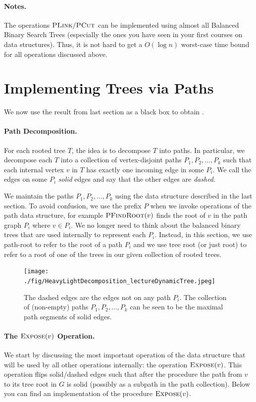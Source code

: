 \paragraph{Notes.} The operations $\textsc{PLink}/ \textsc{PCut}$ can be implemented using almost all Balanced Binary Search Trees (especially the ones you have seen in your first courses on data structures). Thus, it is not hard to get a $O(\log n)$ worst-case time bound for all operations discussed above.

\section{Implementing Trees via Paths}

We now use the result from last section as a black box to obtain .

\paragraph{Path Decomposition.} For each rooted tree $T$, the idea is to decompose $T$ into paths. In particular, we decompose each $T$ into a collection of vertex-disjoint paths $P_1, P_2, \dots, P_k$ such that each internal vertex $v$ in $T$ has exactly one incoming edge in some $P_i$. We call the edges on some $P_i$  \emph{solid} edges and say that the other edges are \emph{dashed}. 

We maintain the paths $P_1, P_2, \dots, P_k$ using the data structure described in the last section. To avoid confusion, we use the prefix $P$ when we invoke operations of the path data structure, for example $\textsc{PFindRoot}(v)$ finds the root of $v$ in the path graph $P_i$ where $v \in P_i$.
We no longer need to think about the balanced binary trees that are used internally to represent each $P_i$. Instead, in this section, we use path-root to refer to the root of a path $P_i$ and we use tree root (or just root) to refer to a root of one of the trees in our given collection of rooted trees.

\begin{figure}[!ht]
    \centering
    \texttt{[image: ./fig/HeavyLightDecomposition\_lectureDynamicTree.jpeg]}
    \caption{The dashed edges are the edges not on any path $P_i$. The collection of (non-empty) paths $P_1, P_2, \dots, P_k$ can be seen to be the maximal path segments of solid edges.}
\end{figure}

\paragraph{The $\textsc{Expose}(v)$ Operation.} We start by discussing the most important operation of the data structure that will be used by all other operations internally: the operation $\textsc{Expose}(v)$. This operation flips solid/dashed edges such that after the procedure the path from $v$ to its tree root in $G$ is solid (possibly as a subpath in the path collection). Below you can find an implementation of the procedure $\textsc{Expose}(v)$. 

